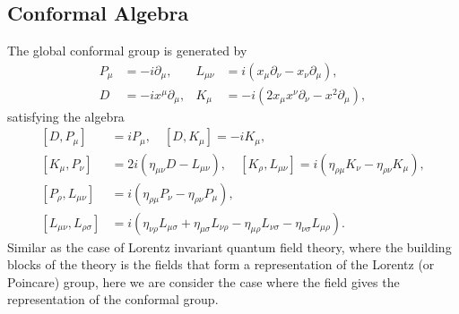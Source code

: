 \documentclass[aps,prb,superscriptaddress,nofootinbib]{revtex4}
\begin{document}
\subsection{Conformal Algebra}
The global conformal group is generated by
\begin{equation}
\begin{aligned}
	P_{\mu} &=-i \partial_{\mu}, &
	L_{\mu \nu} &= i\left(x_{\mu} \partial_{\nu}-x_{\nu} \partial_{\mu}\right), \\
	D &= -i x^{\mu} \partial_{\mu}, &
	K_{\mu} &= -i\left(2 x_{\mu} x^{\nu} \partial_{\nu}-x^{2} \partial_{\mu}\right),
\end{aligned}
\end{equation}
satisfying the algebra
\begin{equation}
\begin{aligned}
	{\left[D, P_{\mu}\right] } &=i P_{\mu}, \quad
	{\left[D, K_{\mu}\right] } =-i K_{\mu}, \\
	{\left[K_{\mu}, P_{\nu}\right] } &=2 i\left(\eta_{\mu \nu} D-L_{\mu \nu}\right), \quad
	{\left[K_{\rho}, L_{\mu \nu}\right] } =i\left(\eta_{\rho \mu} K_{\nu}-\eta_{\rho \nu} K_{\mu}\right), \\
	{\left[P_{\rho}, L_{\mu \nu}\right] } &=i\left(\eta_{\rho \mu} P_{\nu}-\eta_{\rho \nu} P_{\mu}\right), \\
	{\left[L_{\mu \nu}, L_{\rho \sigma}\right] } &=i\left(\eta_{\nu \rho} L_{\mu \sigma}+\eta_{\mu \sigma} L_{\nu \rho}-\eta_{\mu \rho} L_{\nu \sigma}-\eta_{\nu \sigma} L_{\mu \rho}\right).
\end{aligned}
\end{equation}
Similar as the case of Lorentz invariant quantum field theory, where the building blocks of the theory is the fields that form a representation of the Lorentz (or Poincare) group, here we are consider the case where the field gives the representation of the conformal group.
                                                                                                      
\end{document}
